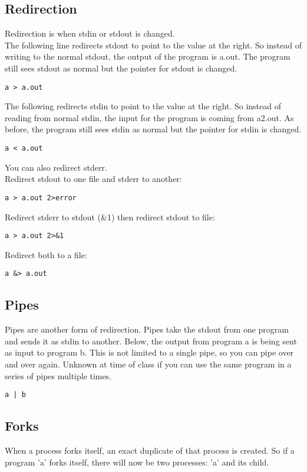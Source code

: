 \documentclass{report}
\begin{document}
\subsection{Redirection}
Redirection is when stdin or stdout is changed.\\

The following line redirects stdout to point to the value at the right. So instead of writing to the normal stdout, the output of the program is a.out. The program still sees stdout as normal but the pointer for stdout is changed.
\begin{verbatim}
a > a.out
\end{verbatim}

The following redirects stdin to point to the value at the right. So instead of reading from normal stdin, the input for the program is coming from a2.out. As before, the program still sees stdin as normal but the pointer for stdin is changed.
\begin{verbatim}
a < a.out
\end{verbatim}

You can also redirect stderr.\\
Redirect stdout to one file and stderr to another:
\begin{verbatim}
a > a.out 2>error
\end{verbatim}
Redirect stderr to stdout (\&1) then redirect stdout to file:
\begin{verbatim}
a > a.out 2>&1
\end{verbatim}
Redirect both to a file:
\begin{verbatim}
a &> a.out
\end{verbatim}

\subsection{Pipes}
Pipes are another form of redirection. Pipes take the stdout from one program and sends it as stdin to another. Below, the output from program a is being sent as input to program b. This is not limited to a single pipe, so you can pipe over and over again. Unknown at time of class if you can use the same program in a series of pipes multiple times.
\begin{verbatim}
a | b
\end{verbatim}

\subsection{Forks}
When a process forks itself, an exact duplicate of that process is created. So if a program 'a' forks itself, there will now be two processes: 'a' and its child.\\
\end{document}
